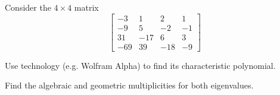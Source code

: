 \begin{applicationActivities}{4}{28}

\begin{activity}{20}
  Consider the \(4\times 4\) matrix
  \[
    \begin{bmatrix}
      -3 & 1 & 2 & 1 \\
      -9 & 5 & -2 & -1 \\
      31 & -17 & 6 & 3 \\
      -69 & 39 & -18 & -9
    \end{bmatrix}
  \]
  \begin{subactivity}
    Use technology (e.g. Wolfram Alpha) to find its characteristic polynomial.
  \end{subactivity}
  \begin{subactivity}
    Find the algebraic and geometric multiplicities for both eigenvalues.
  \end{subactivity}
\end{activity}



\end{applicationActivities}
